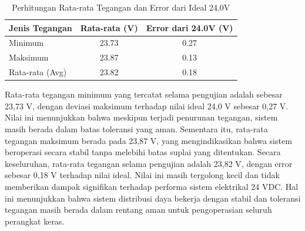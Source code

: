 \begin{table}[H]
	\centering
	\caption{Perhitungan Rata-rata Tegangan dan Error dari Ideal 24.0V}
	\label{tab:rata_rata_error}
	\begin{tabular}{|l|c|c|}
		\hline
		\textbf{Jenis Tegangan} & \textbf{Rata-rata (V)} & \textbf{Error dari 24.0V (V)} \\
		\hline
		Minimum                 & 23.73                  & 0.27                          \\
		Maksimum                & 23.87                  & 0.13                          \\
		Rata-rata (Avg)         & 23.82                  & 0.18                          \\
		\hline
	\end{tabular}
\end{table}

Rata-rata tegangan minimum yang tercatat selama pengujian adalah sebesar 23{,}73
V, dengan deviasi maksimum terhadap nilai ideal 24,0 V sebesar 0{,}27 V. Nilai ini
menunjukkan bahwa meskipun terjadi penurunan tegangan, sistem masih berada dalam
batas toleransi yang aman. Sementara itu, rata-rata tegangan maksimum berada
pada 23{,}87 V, yang mengindikasikan bahwa sistem beroperasi secara stabil tanpa
melebihi batas suplai yang ditentukan. Secara keseluruhan, rata-rata tegangan selama
pengujian adalah 23{,}82 V, dengan error sebesar 0{,}18 V terhadap nilai ideal. Nilai
ini masih tergolong kecil dan tidak memberikan dampak signifikan terhadap performa
sistem elektrikal 24 VDC. Hal ini menunjukkan bahwa sistem distribusi daya
bekerja dengan stabil dan toleransi tegangan masih berada dalam rentang aman
untuk pengoperasian seluruh perangkat keras.


